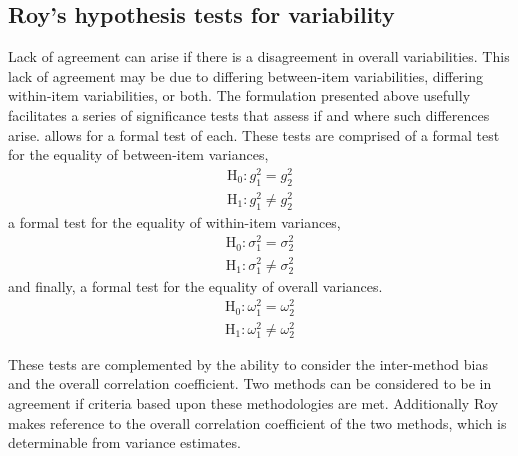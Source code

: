 \newpage
\subsection{Roy's hypothesis tests for variability}
Lack of agreement can arise if there is a disagreement in overall variabilities. This lack of agreement may be due to differing between-item variabilities, differing within-item variabilities, or both. The formulation presented above usefully facilitates a series of significance tests that assess if and where such differences arise. \citet{roy} allows for a formal test of each. These tests are comprised of a formal test for the equality of between-item variances,
\begin{eqnarray*}
\operatorname{H_0} : g^2_1 = g^2_2 \\
\operatorname{H_1} : g^2_1 \neq g^2_2
\end{eqnarray*}
a formal test for the equality of within-item variances,
\begin{eqnarray*}
\operatorname{H_0} : \sigma^2_1 = \sigma^2_2 \\
\operatorname{H_1} : \sigma^2_1 \neq \sigma^2_2
\end{eqnarray*}
and finally, a formal test for the equality of overall variances.
\begin{eqnarray*}
\operatorname{H_0} : \omega^2_1 = \omega^2_2 \\
\operatorname{H_1} : \omega^2_1 \neq \omega^2_2
\end{eqnarray*}

These tests are complemented by the ability to consider the inter-method bias and the overall correlation coefficient.
Two methods can be considered to be in agreement if criteria based upon these methodologies are met. Additionally Roy makes reference to the overall correlation coefficient of the two methods, which is determinable from variance estimates.


